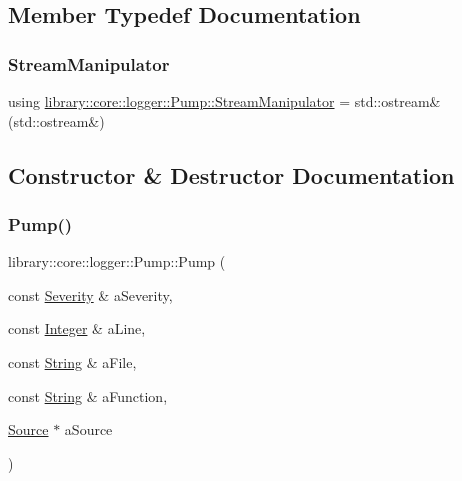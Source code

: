 \subsection{Member Typedef Documentation}
\mbox{\label{classlibrary_1_1core_1_1logger_1_1_pump_ab8990ff21e57c39977af471ddeb57637}} 
\subsubsection{\texorpdfstring{Stream\+Manipulator}{StreamManipulator}}
{\footnotesize\ttfamily using \hyperlink{classlibrary_1_1core_1_1logger_1_1_pump_ab8990ff21e57c39977af471ddeb57637}{library\+::core\+::logger\+::\+Pump\+::\+Stream\+Manipulator} =  std\+::ostream\&(std\+::ostream\&)}



\subsection{Constructor \& Destructor Documentation}
\mbox{\label{classlibrary_1_1core_1_1logger_1_1_pump_af5c515afe6d1ca6c4f388235d4a79562}} 
\subsubsection{\texorpdfstring{Pump()}{Pump()}\hspace{0.1cm}{\footnotesize\ttfamily [1/3]}}
{\footnotesize\ttfamily library\+::core\+::logger\+::\+Pump\+::\+Pump (\begin{DoxyParamCaption}\item[{const \hyperlink{namespacelibrary_1_1core_1_1logger_a35f71353edf64f68f7fe3874b01abaa8}{Severity} \&}]{a\+Severity,  }\item[{const \hyperlink{classlibrary_1_1core_1_1types_1_1_integer}{Integer} \&}]{a\+Line,  }\item[{const \hyperlink{classlibrary_1_1core_1_1types_1_1_string}{String} \&}]{a\+File,  }\item[{const \hyperlink{classlibrary_1_1core_1_1types_1_1_string}{String} \&}]{a\+Function,  }\item[{\hyperlink{classlibrary_1_1core_1_1logger_1_1_source}{Source} $\ast$}]{a\+Source }\end{DoxyParamCaption})}

